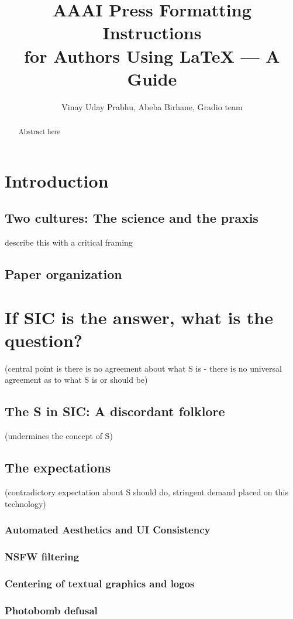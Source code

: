 \documentclass[letterpaper]{article} %
\title{AAAI Press Formatting Instructions \\for Authors Using \LaTeX{} --- A Guide }
\author{Vinay Uday Prabhu, Abeba Birhane, Gradio team
}
\begin{document}
\maketitle

\begin{abstract}
Abstract here
\end{abstract}



\section{Introduction}
\subsection{Two cultures: The science and the praxis}
describe this with a critical framing 
\subsection{Paper organization}
\section{If SIC is the answer, what is the question? }
(central point is there is no agreement about what S is - there  is no universal agreement as to what S is or should be) 
\subsection{The S in SIC: A discordant folklore}
(undermines the concept of S)
\subsection{The expectations}
(contradictory expectation about S should do, stringent demand placed on this technology) 
\subsubsection{Automated Aesthetics and UI Consistency}
\subsubsection{NSFW filtering}
\subsubsection{Centering of textual graphics and logos}
\subsubsection{Photobomb defusal}
\end{document}
